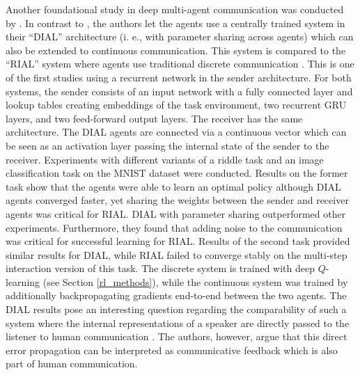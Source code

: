 Another foundational study in deep multi-agent communication was conducted by \cite{foerster2016learning}. In contrast to \cite{lazaridou2016multi}, the authors let the agents use a centrally trained system in their ``DIAL'' architecture (i. e., with parameter sharing across agents)  which can also be extended to continuous communication. This system is compared to the ``RIAL'' system where agents use traditional discrete communication \parencite[][p. 2]{foerster2016learning}. This is one of the first studies using a recurrent network in the sender architecture.
For both systems, the sender consists of an input network with a fully connected layer and lookup tables creating embeddings of the task environment, two recurrent GRU layers, and two feed-forward output layers.
The receiver has the same architecture. The DIAL agents are connected via a continuous vector which can be seen as an activation layer passing the internal state of the sender to the receiver.
Experiments with different variants of a riddle task and an image classification task on the MNIST dataset were conducted. Results on the former task show that the agents were able to learn an optimal policy although DIAL agents converged faster, yet sharing the weights between the sender and receiver agents was critical for RIAL. DIAL with parameter sharing outperformed other experiments. Furthermore, they found that adding noise to the communication was critical for successful learning for RIAL. Results of the second task provided similar results for DIAL, while RIAL failed to converge stably on the multi-step interaction version of this task. 
The discrete system is trained with deep $Q$-learning (see Section \ref{rl_methods}), while the continuous system was trained by additionally backpropagating gradients end-to-end between the two agents. %
The DIAL results pose an interesting question regarding the comparability of such a system where the internal representations of a speaker are directly passed to the listener to human communication \parencite[cf.][]{lazaridou2020emergent, hockett1960origin}. The authors, however, argue that this direct error propagation can be interpreted as communicative feedback which is also part of human communication.

